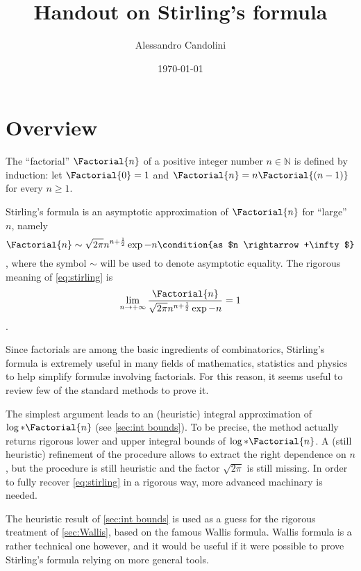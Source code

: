 \documentclass[onecolumn,a4paper,11pt]{article}
\title{Handout  on Stirling's formula}
\author{Alessandro Candolini}
\affiliation{Department of Physics, University Of Trieste, via Valerio~2,
Trieste, Italy}
\date{\today}
\newcommand{\numberset}{\mathbb}
\providecommand{\N}{\numberset{N}}
\theoremstyle{classicdef}
\theoremstyle{remark}
\newcommand{\asympt}{\sim}
\begin{document}
\maketitle


\section{Overview}\label{sec:overview}
The ``factorial'' $\Factorial{n}$ of a positive integer number $n\in\N$ is defined
by induction:
let $\Factorial{0} = 1$ and $\Factorial{n} = n \Factorial{(n-1)}$ for every $n\geq 1$.

Stirling's formula
is an asymptotic approximation of $\Factorial{n}$ for ``large'' $n$, namely
\begin{dmath}[label={stirling}]
   \Factorial{n} \asympt  \sqrt{2\pi} n^{n+ \frac{1}{2}} \exp{-n} 
   \condition{as
      $n \rightarrow+\infty$}
\end{dmath},
where the symbol $\asympt$ will be used to denote asymptotic equality.
The rigorous meaning of 
\cref{eq:stirling} is
   \begin{dmath*}[compact]
   \lim_{n\rightarrow +\infty} \frac{\Factorial{n}}{\sqrt{2\pi}
   n^{n+\frac{1}{2}} \exp{-n}} = 1 
\end{dmath*}.

Since factorials are among the basic ingredients of combinatorics, Stirling's
formula is extremely useful in many fields of mathematics, statistics and
physics to help simplify formul\ae{} involving factorials. For this reason, it
seems useful to review few of the standard methods to prove it.

The simplest argument leads to an (heuristic) integral approximation of
$\log*{\Factorial{n}}$ (see \cref{sec:int bounds}). To be precise, the method
actually returns rigorous lower and upper integral bounds of
$\log*{\Factorial{n}}$. A (still heuristic)  refinement of  the procedure allows
to  extract the right dependence on $n$, but the procedure is still heuristic
and the factor $\sqrt{2\pi}$ is still missing.  In order to fully recover
\cref{eq:stirling} in a rigorous way, more advanced machinary is needed.

The heuristic result of \cref{sec:int bounds} is used as a guess for the
rigorous treatment of \cref{sec:Wallis}, based on the famous Wallis formula.
Wallis formula is a rather technical one however, and it would be useful if it
were possible to prove Stirling's formula relying on more general tools.
\end{document}
